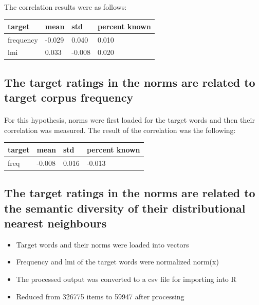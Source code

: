 \documentclass[11pt,a4paper]{article}
\begin{document}
\paragraph{}
The correlation results were as follows:

\begin{table}[H]
\centering
\begin{tabular}{@{}llll@{}}
\toprule
target    & mean   & std    & percent known \\ \midrule
frequency & -0.029 & 0.040  & 0.010         \\
lmi       & 0.033  & -0.008 & 0.020         \\ \bottomrule
\end{tabular}
\end{table}

\subsection{The target ratings in the norms are related to target corpus frequency}
\paragraph{}
For this hypothesis, norms were first loaded for the target words and then their correlation was measured. The result of the correlation was the following:

\begin{table}[H]
\centering
\begin{tabular}{@{}llll@{}}
\toprule
target & mean   & std   & percent known \\ \midrule
freq   & -0.008 & 0.016 & -0.013       \\ \bottomrule
\end{tabular}
\end{table}

\subsection{The target ratings in the norms are related to the semantic diversity of their distributional nearest neighbours}

\begin{itemize}
	\item Target words and their norms were loaded into vectors
	\item Frequency and lmi of the target words were normalized
	norm(x)
	\item The processed output was converted to a csv file for importing into R
	\item Reduced from 326775 items to 59947 after processing
\end{itemize}





\end{document}
